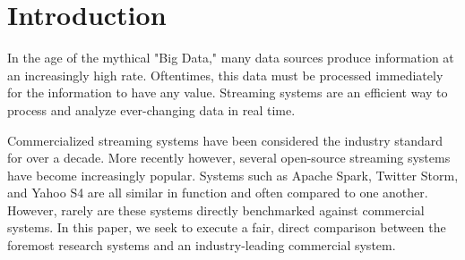 \section{Introduction}
In the age of the mythical "Big Data," many data sources produce information at an increasingly high rate.  Oftentimes, this data must be processed immediately for the information to have any value.  Streaming systems are an efficient way to process and analyze ever-changing data in real time.  

Commercialized streaming systems have been considered the industry standard for over a decade.  More recently however, several open-source streaming systems have become increasingly popular.  Systems such as Apache Spark, Twitter Storm, and Yahoo S4 are all similar in function and often compared to one another.  However, rarely are these systems directly benchmarked against commercial systems.  In this paper, we seek to execute a fair, direct comparison between the foremost research systems and an industry-leading commercial system.